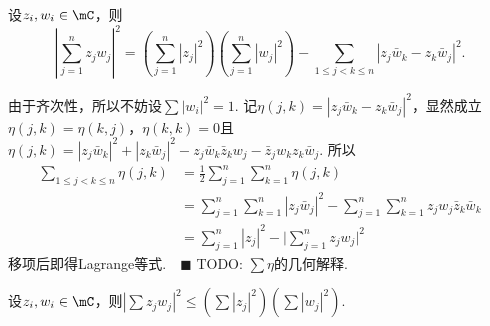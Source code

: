  \begin{thm}[Lagrange等式]
    设$z_i, w_i \in \mC$，则
    \[
      |\sum_{j=1}^n z_jw_j|^2 = \left(\sum_{j=1}^n|z_j|^2\right)
      \left(\sum_{j=1}^n|w_j|^2\right) - \sum_{1\le j<k\le n}
      |z_j\bar{w}_k - z_k\bar{w}_j|^2.
    \]
  \end{thm}
  \proof
    由于齐次性，所以不妨设$\sum |w_i|^2 = 1$. 记$\eta(j, k) =
    |z_j\bar{w}_k - z_k\bar{w}_j|^2$，显然成立
    $\eta(j, k) = \eta(k, j)$，$\eta(k, k) = 0$且$\eta(j, k)=
    |z_j\bar{w}_k|^2 + |z_k\bar{w}_j|^2 - z_j\bar{w}_k\bar{z}_kw_j
    - \bar{z}_jw_kz_k\bar{w}_j$. 所以
    \[\begin{split}
      \sum_{1\le j<k\le n}\eta(j, k)
      &= \frac{1}{2}\sum_{j=1}^n\sum_{k=1}^n\eta(j, k) \\
      &= \sum_{j=1}^n\sum_{k=1}^n|z_j\bar{w}_j|^2
          - \sum_{j=1}^n\sum_{k=1}^nz_jw_j\bar{z}_k\bar{w}_k \\
      &= \sum_{j=1}^n|z_j|^2 - \big| \sum_{j=1}^nz_jw_j \big|^2
    \end{split}\]
    移项后即得Lagrange等式.$\quad\blacksquare$
  \remark
    TODO: $\sum\eta$的几何解释.

  \begin{cor}[Cauchy不等式]
    设$z_i, w_i \in \mC$，则$|\sum z_jw_j|^2 \le (\sum|z_j|^2)(\sum|w_j|^2)$.
  \end{cor}


